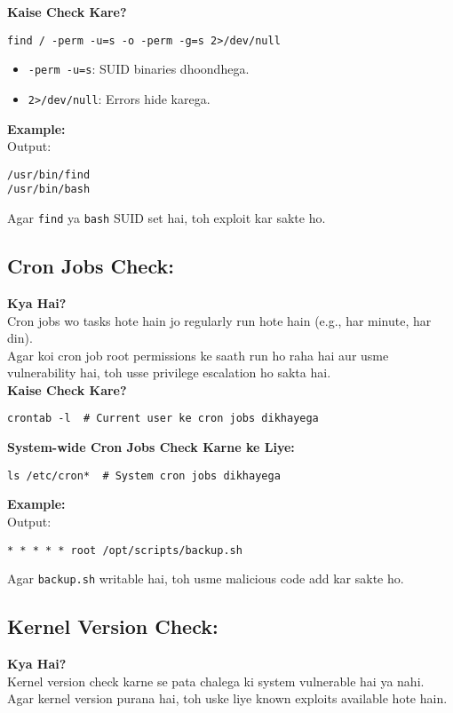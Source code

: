 \documentclass[a4paper]{article}
\begin{document}
\textbf{Kaise Check Kare?} \\
\begin{lstlisting}
find / -perm -u=s -o -perm -g=s 2>/dev/null  
\end{lstlisting}
\begin{itemize}
  \item \texttt{-perm -u=s}: SUID binaries dhoondhega.
  \item \texttt{2>/dev/null}: Errors hide karega.
\end{itemize}

\textbf{Example:} \\
Output: \\
\begin{lstlisting}
/usr/bin/find  
/usr/bin/bash  
\end{lstlisting}
Agar \texttt{find} ya \texttt{bash} SUID set hai, toh exploit kar sakte ho.

\subsection{Cron Jobs Check:}
\textbf{Kya Hai?} \\
Cron jobs wo tasks hote hain jo regularly run hote hain (e.g., har minute, har din). \\
Agar koi cron job root permissions ke saath run ho raha hai aur usme vulnerability hai, toh usse privilege escalation ho sakta hai. \\

\textbf{Kaise Check Kare?} \\
\begin{lstlisting}
crontab -l  # Current user ke cron jobs dikhayega
\end{lstlisting}
\textbf{System-wide Cron Jobs Check Karne ke Liye:} \\
\begin{lstlisting}
ls /etc/cron*  # System cron jobs dikhayega
\end{lstlisting}

\textbf{Example:} \\
Output: \\
\begin{lstlisting}
* * * * * root /opt/scripts/backup.sh  
\end{lstlisting}
Agar \texttt{backup.sh} writable hai, toh usme malicious code add kar sakte ho.

\subsection{Kernel Version Check:}
\textbf{Kya Hai?} \\
Kernel version check karne se pata chalega ki system vulnerable hai ya nahi. \\
Agar kernel version purana hai, toh uske liye known exploits available hote hain. \\
\end{document}
